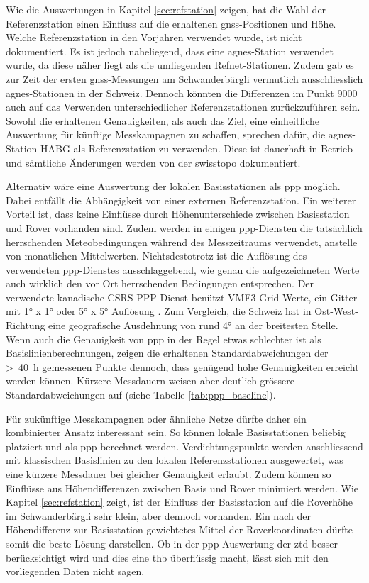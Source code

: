 Wie die Auswertungen in Kapitel \ref{sec:refstation} zeigen, hat die Wahl der Referenzstation einen Einfluss 
auf die erhaltenen \acrshort{gnss}-Positionen und Höhe. 
Welche Referenzstation in den Vorjahren verwendet wurde, ist nicht dokumentiert. Es ist jedoch naheliegend, dass eine 
\acrshort{agnes}-Station verwendet wurde, da diese näher liegt als die umliegenden Refnet-Stationen. Zudem gab es zur Zeit 
der ersten \acrshort{gnss}-Messungen am Schwanderbärgli vermutlich ausschliesslich \acrshort{agnes}-Stationen in der Schweiz. Dennoch 
könnten die Differenzen im Punkt 9000 auch auf das Verwenden unterschiedlicher Referenzstationen zurückzuführen sein. 
Sowohl die erhaltenen Genauigkeiten, als auch das Ziel, eine einheitliche Auswertung für künftige Messkampagnen zu schaffen, 
sprechen dafür, die \acrshort{agnes}-Station HABG als Referenzstation zu verwenden. Diese ist dauerhaft in Betrieb und sämtliche Änderungen 
werden von der swisstopo dokumentiert. 

Alternativ wäre eine Auswertung der lokalen Basisstationen als \gls{ppp} möglich. Dabei 
entfällt die Abhängigkeit von einer externen Referenzstation. Ein weiterer Vorteil ist, dass keine Einflüsse durch Höhenunterschiede 
zwischen Basisstation und Rover vorhanden sind. 
Zudem werden in einigen \acrshort{ppp}-Diensten die tatsächlich herrschenden Meteobedingungen während des Messzeitraums verwendet, 
anstelle von monatlichen Mittelwerten. Nichtsdestotrotz ist die Auflösung des verwendeten \acrshort{ppp}-Dienstes 
ausschlaggebend, wie genau die aufgezeichneten Werte auch wirklich den vor Ort herrschenden Bedingungen entsprechen.
Der verwendete kanadische CSRS-PPP Dienst benützt VMF3 Grid-Werte, ein Gitter mit 1° x 1° oder 5° x 5° Auflösung \parencite{landskronVMF3GPT3Refined2018}.
Zum Vergleich, die Schweiz hat in Ost-West-Richtung eine geografische Ausdehnung von rund 4° an der breitesten Stelle.
Wenn auch die Genauigkeit von \gls{ppp} in der Regel etwas schlechter ist als Basislinienberechnungen, zeigen 
die erhaltenen Standardabweichungen der >~40~h gemessenen Punkte dennoch, dass genügend hohe Genauigkeiten 
erreicht werden können. Kürzere Messdauern weisen aber deutlich grössere Standardabweichungen auf (siehe Tabelle \ref{tab:ppp_baseline}). 

Für zukünftige Messkampagnen oder ähnliche Netze dürfte daher ein kombinierter Ansatz interessant sein. 
So können lokale Basisstationen beliebig platziert und als \gls{ppp} berechnet werden. Verdichtungspunkte 
werden anschliessend mit klassischen Basislinien zu den lokalen Referenzstationen ausgewertet, was eine kürzere 
Messdauer bei gleicher Genauigkeit erlaubt. Zudem können so Einflüsse aus Höhendifferenzen zwischen Basis und 
Rover minimiert werden. Wie Kapitel \ref{sec:refstation} zeigt, ist der Einfluss der Basisstation 
auf die Roverhöhe im Schwanderbärgli sehr klein, aber dennoch vorhanden. Ein nach der Höhendifferenz zur 
Basisstation gewichtetes Mittel der Roverkoordinaten dürfte somit die beste Lösung darstellen. 
Ob in der \acrshort{ppp}-Auswertung der \gls{ztd} besser berücksichtigt wird und dies eine \gls{thb} überflüssig macht, 
lässt sich mit den vorliegenden Daten nicht sagen.

